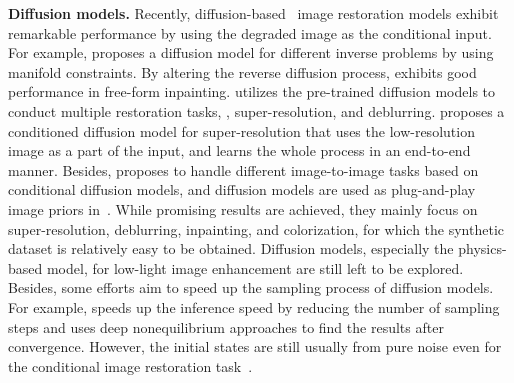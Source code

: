 \documentclass[10pt,twocolumn,letterpaper]{article}
\newcommand{\para}[1]{\noindent\textbf{#1}}
\begin{document}
\para{Diffusion models.}
Recently, diffusion-based~\cite{song2020denoising, ho2020denoising} image restoration models \cite{whang2022deblurring, wang2021s3rp} exhibit remarkable performance by using the degraded image as the conditional input. For example, \cite{chung2022improving} proposes a diffusion model for different inverse problems by using manifold constraints. By altering the reverse diffusion process, \cite{lugmayr2022repaint} exhibits good performance in free-form inpainting. \cite{kawardenoising} utilizes the pre-trained diffusion models to conduct multiple restoration tasks, \eg, super-resolution, and deblurring. \cite{saharia2022image} proposes a conditioned diffusion model for super-resolution that uses the low-resolution image as a part of the input, and learns the whole process in an end-to-end manner. Besides, \cite{saharia2022palette} proposes to handle different image-to-image tasks based on conditional diffusion models, and diffusion models are used as plug-and-play image priors in~\cite{graikosdiffusion}. While promising results are achieved, they mainly focus on super-resolution, deblurring, inpainting, and colorization, for which the synthetic dataset is relatively easy to be obtained. Diffusion models, especially the physics-based model, for low-light image enhancement are still left to be explored. Besides, some efforts \cite{zhang2022gddim, pokledeep, guo2022shadowdiffusion, ma2022accelerating} aim to speed up the sampling process of diffusion models. For example, \cite{zhang2022gddim} speeds up the inference speed by reducing the number of sampling steps and \cite{pokledeep} uses deep nonequilibrium approaches to find the results after convergence. However, the initial states are still usually from pure noise even for the conditional image restoration task~\cite{guo2022shadowdiffusion, saharia2022image}.  
\end{document}
